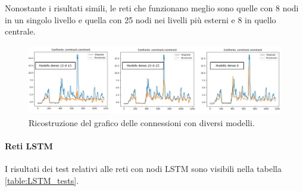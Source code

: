 Nonostante i risultati simili, le reti che funzionano meglio sono quelle con 8 nodi in un singolo livello e quella con 25 nodi nei livelli più esterni e 8 in quello centrale.

\begin{figure}[]
    \label{fig:reconstructions}
    \includegraphics[width=\hsize]{images/my_work/confronto_modelli.png}
    \caption{Ricostruzione del grafico delle connessioni con diversi modelli.}
    \centering
\end{figure}

\paragraph{Reti LSTM} I risultati dei test relativi alle reti con nodi LSTM sono visibili nella tabella \ref{table:LSTM_tests}.


